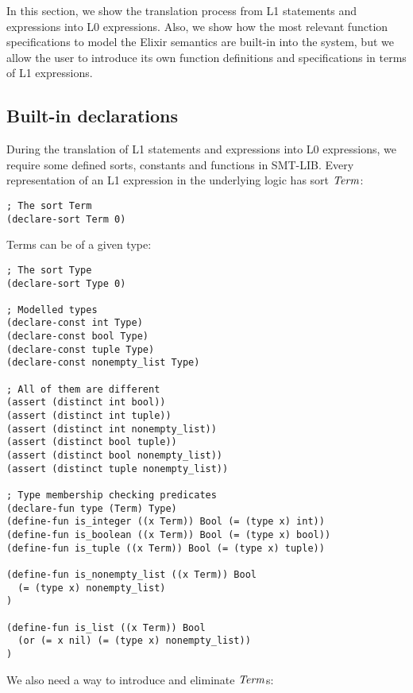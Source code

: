 In this section, we show the translation process from L1 statements and
expressions into L0 expressions. Also, we show how the most relevant function
specifications to model the Elixir semantics are built-in into the system, but
we allow the user to introduce its own function definitions and specifications
in terms of L1 expressions.

\subsection{Built-in declarations}

During the translation of L1 statements and expressions into L0 expressions, we 
require some defined sorts, constants and functions in SMT-LIB. Every representation
of an L1 expression in the underlying logic has sort $\mathit{Term}$:

\begin{verbatim}
; The sort Term
(declare-sort Term 0)
\end{verbatim}

Terms can be of a given type:

\begin{verbatim}
; The sort Type
(declare-sort Type 0)

; Modelled types
(declare-const int Type)
(declare-const bool Type)
(declare-const tuple Type)
(declare-const nonempty_list Type)

; All of them are different
(assert (distinct int bool))
(assert (distinct int tuple))
(assert (distinct int nonempty_list))
(assert (distinct bool tuple))
(assert (distinct bool nonempty_list))
(assert (distinct tuple nonempty_list))

; Type membership checking predicates
(declare-fun type (Term) Type)
(define-fun is_integer ((x Term)) Bool (= (type x) int))
(define-fun is_boolean ((x Term)) Bool (= (type x) bool))
(define-fun is_tuple ((x Term)) Bool (= (type x) tuple))

(define-fun is_nonempty_list ((x Term)) Bool 
  (= (type x) nonempty_list)
)

(define-fun is_list ((x Term)) Bool 
  (or (= x nil) (= (type x) nonempty_list))
)
\end{verbatim}

We also need a way to introduce and eliminate $\mathit{Term}$s:

